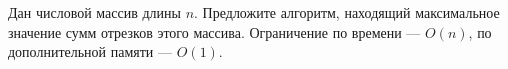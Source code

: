 \documentclass{article}
\begin{document}
Дан числовой массив длины $n$. Предложите алгоритм, находящий максимальное значение сумм отрезков этого массива. 
Ограничение по времени --- $O(n)$, по дополнительной памяти --- $O(1)$.
\end{document}

